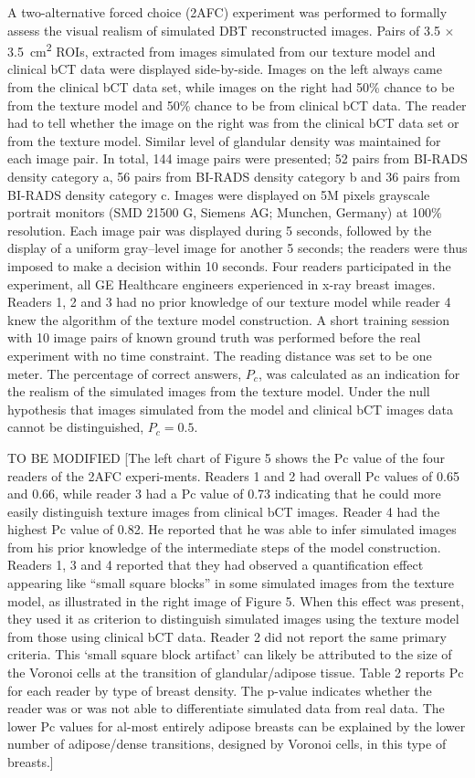 \documentclass[journal]{IEEEtran}
\begin{document}
A two-alternative forced choice (2AFC) experiment was performed to
formally assess the visual realism of simulated DBT reconstructed
images. Pairs of 3.5 $\times$ \SI{3.5}{\cm\squared} ROIs, extracted
from images simulated from our texture model and clinical bCT data
were displayed side-by-side. Images on the left always came from the
clinical bCT data set, while images on the right had 50\% chance to be
from the texture model and 50\% chance to be from clinical bCT
data. The reader had to tell whether the image on the right was from
the clinical bCT data set or from the texture model. Similar level of
glandular density was maintained for each image pair. In total, 144
image pairs were presented; 52 pairs from BI-RADS density category a,
56 pairs from BI-RADS density category b and 36 pairs from BI-RADS
density category c. Images were displayed on 5M pixels grayscale
portrait monitors (SMD 21500 G, Siemens AG; Munchen, Germany) at 100\%
resolution. Each image pair was displayed during 5 seconds, followed
by the display of a uniform gray–level image for another 5 seconds;
the readers were thus imposed to make a decision within 10
seconds. Four readers participated in the experiment, all GE
Healthcare engineers experienced in x-ray breast images. Readers 1, 2
and 3 had no prior knowledge of our texture model while reader 4 knew
the algorithm of the texture model construction. A short training
session with 10 image pairs of known ground truth was performed before
the real experiment with no time constraint. The reading distance was
set to be one meter. The percentage of correct answers, $P_c$, was
calculated as an indication for the realism of the simulated images
from the texture model. Under the null hypothesis that images
simulated from the model and clinical bCT images data cannot be
distinguished, $P_c = 0.5$.

TO BE MODIFIED [The left chart of Figure 5 shows the Pc value of the
four readers of the 2AFC experi-ments. Readers 1 and 2 had overall Pc
values of 0.65 and 0.66, while reader 3 had a Pc value of 0.73
indicating that he could more easily distinguish texture images from
clinical bCT images. Reader 4 had the highest Pc value of 0.82. He
reported that he was able to infer simulated images from his prior
knowledge of the intermediate steps of the model construction. Readers
1, 3 and 4 reported that they had observed a quantification effect
appearing like “small square blocks” in some simulated images from the
texture model, as illustrated in the right image of Figure 5. When
this effect was present, they used it as criterion to distinguish
simulated images using the texture model from those using clinical bCT
data. Reader 2 did not report the same primary criteria. This ‘small
square block artifact’ can likely be attributed to the size of the
Voronoi cells at the transition of glandular/adipose tissue. Table 2
reports Pc for each reader by type of breast density. The p-value
indicates whether the reader was or was not able to differentiate
simulated data from real data. The lower Pc values for al-most
entirely adipose breasts can be explained by the lower number of
adipose/dense transitions, designed by Voronoi cells, in this type of
breasts.]
\end{document}
